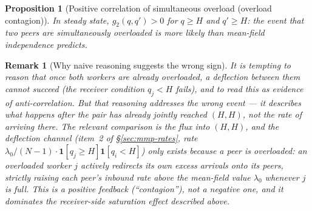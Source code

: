 \documentclass[11pt,a4paper]{report}
\newtheorem{proposition}[theorem]{Proposition}
\newtheorem{remark}{Remark}[section]
\newcommand{\gtwo}{g_2}
\begin{document}
\begin{proposition}[Positive correlation of simultaneous overload
(overload contagion)]
\label{prop:anticorr}
In steady state, $\gtwo(q, q') > 0$ for $q \geq H$ and $q' \geq H$: the
event that two peers are simultaneously overloaded is \emph{more}
likely than mean-field independence predicts.
\end{proposition}

\begin{remark}[Why naive reasoning suggests the wrong sign]
It is tempting to reason that once both workers are already overloaded,
a deflection between them cannot succeed (the receiver condition
$q_j < H$ fails), and to read this as evidence of anti-correlation. But
that reasoning addresses the wrong event --- it describes what happens
\emph{after} the pair has already jointly reached $(H,H)$, not the
\emph{rate of arriving there}. The relevant comparison is the flux
\emph{into} $(H,H)$, and the deflection channel (item~2 of
\S\ref{sec:mmp-rates}, rate $\lambda_0/(N-1) \cdot
\mathbf{1}[q_j \geq H]\mathbf{1}[q_i<H]$) only \emph{exists} because a
peer is overloaded: an overloaded worker $j$ actively redirects its own
excess arrivals onto its peers, strictly raising each peer's inbound
rate above the mean-field value $\lambda_0$ whenever $j$ is full. This
is a positive feedback (``contagion''), not a negative one, and it
dominates the receiver-side saturation effect described above.
\end{remark}
\end{document}
